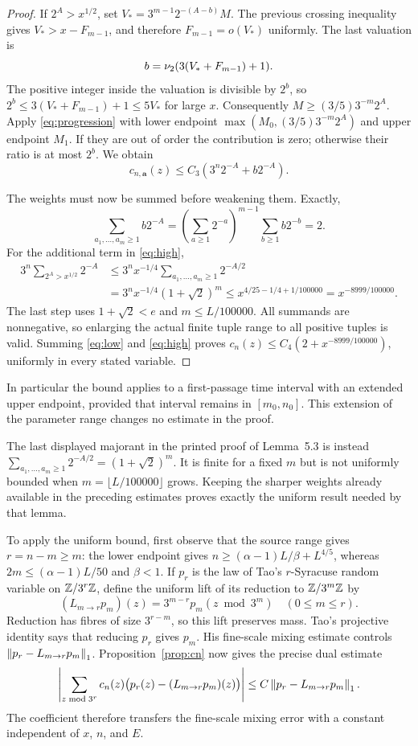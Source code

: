 \begin{proof}
If $2^A>x^{1/2}$, set $V_*=3^{m-1}2^{-(A-b)}M$.
The previous crossing inequality gives $V_*>x-F_{m-1}$, and therefore
$F_{m-1}=o(V_*)$ uniformly.  The last valuation is
\[
 b=\nu_2(3(V_*+F_{m-1})+1).
\]
The positive integer inside the valuation is divisible by $2^b$, so
$2^b\leq3(V_*+F_{m-1})+1\leq5V_*$ for large $x$.
Consequently $M\geq(3/5)3^{-m}2^A$.  Apply
\eqref{eq:progression} with lower endpoint
$\max(M_0,(3/5)3^{-m}2^A)$ and upper endpoint $M_1$.
If they are out of order the contribution is zero; otherwise their ratio
is at most $2^b$.  We obtain
\begin{equation}\label{eq:high}
 c_{n,\mathbf a}(z)\leq C_3(3^n2^{-A}+b2^{-A}).
\end{equation}

The weights must now be summed before weakening them.  Exactly,
\[
 \sum_{a_1,\ldots,a_m\geq1}b2^{-A}
 =\left(\sum_{a\geq1}2^{-a}\right)^{m-1}
    \sum_{b\geq1}b2^{-b}=2.
\]
For the additional term in \eqref{eq:high},
\begin{align*}
 3^n\sum_{2^A>x^{1/2}}2^{-A}
 &\leq3^nx^{-1/4}\sum_{a_1,\ldots,a_m\geq1}2^{-A/2}\\
 &=3^nx^{-1/4}(1+\sqrt2)^m
 \leq x^{4/25-1/4+1/100000}
 =x^{-8999/100000}.
\end{align*}
The last step uses $1+\sqrt2<e$ and $m\leq L/100000$.
All summands are nonnegative, so enlarging the actual finite tuple range
to all positive tuples is valid.  Summing \eqref{eq:low} and
\eqref{eq:high} proves $c_n(z)\leq C_4(2+x^{-8999/100000})$, uniformly
in every stated variable.
\end{proof}

In particular the bound applies to a first-passage time interval with an
extended upper endpoint, provided that interval remains in $[m_0,n_0]$.
This extension of the parameter range changes no estimate in the proof.

The last displayed majorant in the printed proof of Lemma~5.3 is instead
$\sum_{a_1,\ldots,a_m\geq1}2^{-A/2}=(1+\sqrt2)^m$.
It is finite for a fixed $m$ but is not uniformly bounded when
$m=\lfloor L/100000\rfloor$ grows.  Keeping the sharper weights already
available in the preceding estimates proves exactly the uniform result
needed by that lemma.

To apply the uniform bound, first observe that the source range gives
$r=n-m\geq m$: the lower endpoint gives
$n\geq(\alpha-1)L/\beta+L^{4/5}$, whereas
$2m\leq(\alpha-1)L/50$ and $\beta<1$.
If $p_r$ is the law of Tao's
$r$-Syracuse random variable on $\mathbb Z/3^r\mathbb Z$, define the uniform lift of
its reduction to $\mathbb Z/3^m\mathbb Z$ by
\[
 (L_{m\to r}p_m)(z)=3^{m-r}p_m(z\bmod3^m)\quad(0\leq m\leq r).
\]
Reduction has fibres of size $3^{r-m}$, so this lift preserves mass.
Tao's projective identity says that reducing $p_r$ gives $p_m$.
His fine-scale mixing estimate controls
$\left\|p_r-L_{m\to r}p_m\right\|_1$.  Proposition~\ref{prop:cn} now gives
the precise dual estimate
\[
 \left|\sum_{z\bmod3^r}c_n(z)
       \bigl(p_r(z)-(L_{m\to r}p_m)(z)\bigr)\right|
 \leq C\left\|p_r-L_{m\to r}p_m\right\|_1.
\]
The coefficient therefore transfers the fine-scale mixing error with
a constant independent of $x$, $n$, and $E$.
